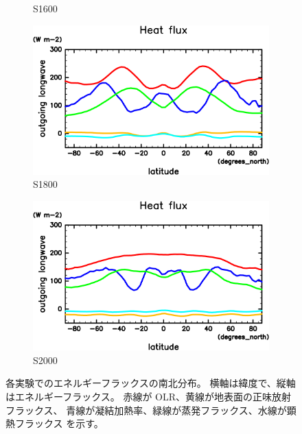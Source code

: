 \documentclass[body]{subfiles}
\begin{document}
\begin{figure}[t]
\begin{subfigure}{.4\textwidth}
		\caption{S1600}\label{EnFlx南北分布S1600}
	\end{subfigure}
	\begin{subfigure}{.4\textwidth}
		\centering
		\includegraphics[width=\columnwidth]{S1800/HeatFlx,time=3650:4015-crop-rotate.pdf}
		\caption{S1800}\label{EnFlx南北分布S1800}
	\end{subfigure}
	\begin{subfigure}{.4\textwidth}
		\centering
		\includegraphics[width=\columnwidth]{S2000/HeatFlx,time=7300:7665-crop-rotate.pdf}
		\caption{S2000}\label{EnFlx南北分布S2000}
	\end{subfigure}
	\caption[各実験でのエネルギーフラックス南北分布]{
		各実験でのエネルギーフラックスの南北分布。
		横軸は緯度で、縦軸はエネルギーフラックス\hmu*{[W/m^2]}。
		赤線が OLR、黄線が地表面の正味放射フラックス、
		青線が凝結加熱率、緑線が蒸発フラックス、水線が顕熱フラックス
		を示す。
	}\label{EnFlx南北分布}
\end{figure}
\end{document}
